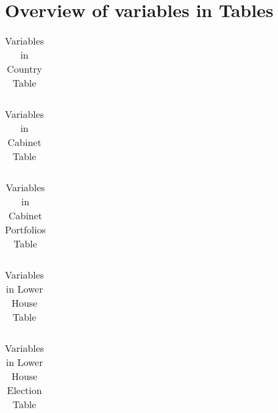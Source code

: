 \section{Overview of variables in Tables}\label{sec_appx_table_overview}


\begin{center}
\begin{longtable}{L{4cm} L{6cm} L{3cm}}
\caption{Variables in Country Table\label{tab_country}}


\end{longtable}
\end{center}

\newpage

\begin{center}
\begin{longtable}{L{4cm} L{6cm} L{3cm}}
\caption{Variables in Cabinet Table\label{tab_country}}


\end{longtable}
\end{center}

\newpage

\begin{center}
\begin{longtable}{L{4cm} L{6cm} L{3cm}}
\caption{Variables in Cabinet Portfolios Table\label{tab_country}}


\end{longtable}
\end{center}

\newpage

\begin{center}
\begin{longtable}{L{4cm} L{6cm} L{3cm}}
\caption{Variables in Lower House Table\label{tab_country}}


\end{longtable}
\end{center}

\newpage

\begin{center}
\begin{longtable}{L{4cm} L{6cm} L{3cm}}
\caption{Variables in Lower House Election Table\label{tab_country}}


\end{longtable}
\end{center}

